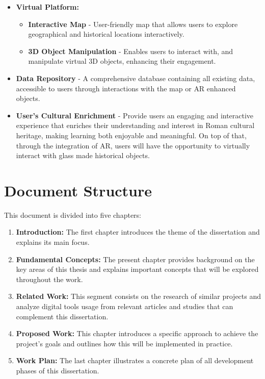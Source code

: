 \begin{itemize}
   \item \textbf{Virtual Platform:}
   \begin{itemize}
      \item \textbf{Interactive Map} - User-friendly map that allows users to explore geographical and historical locations interactively.
      \item \textbf{3D Object Manipulation} - Enables users to interact with, and manipulate virtual 3D objects, enhancing their engagement.
   \end{itemize}
   \item \textbf{Data Repository} - A comprehensive database containing all existing data, accessible to users through interactions with the map or \gls{AR} enhanced objects.
   \item \textbf{User's Cultural Enrichment} - Provide users an engaging and interactive experience that enriches their understanding and interest
   in Roman cultural heritage, making learning both enjoyable and meaningful.
   On top of that, through the integration of \gls{AR}, users will have the opportunity to virtually interact with glass made historical objects.
\end{itemize}


\section{Document Structure}
\label{sec:document_structure}


This document is divided into five chapters:


\begin{enumerate}
  \item \textbf{Introduction:} The first chapter introduces the theme of the dissertation and explains its main focus.
  
  \item \textbf{Fundamental Concepts:} The present chapter provides background on the key areas of this thesis and explains important concepts that will be explored throughout the work.
  
  \item \textbf{Related Work:} This segment consists on the research of similar projects and analyze digital tools usage from relevant articles and studies that can complement this dissertation.

  \item \textbf{Proposed Work:} This chapter introduces a specific approach to achieve the project's goals and outlines how this will be implemented in practice.
  
  \item \textbf{Work Plan:} The last chapter illustrates a concrete plan of all development phases of this dissertation.
\end{enumerate}
